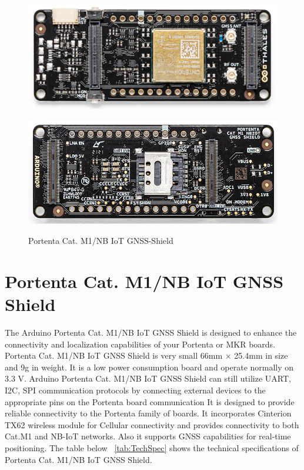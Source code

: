 \begin{figure}
	\begin{center}
		\includegraphics[width=0.7\linewidth]{Images/PotentaIoTGNSSShield/BoardFront.png}
		\label{BoardFront}
	\end{center}
\end{figure}

\begin{figure}
	\begin{center}
		\includegraphics[width=0.7\linewidth]{Images/PotentaIoTGNSSShield/BoardBack.png}
		\caption{Portenta Cat. M1/NB IoT GNSS-Shield}
		\label{BoardBack}
		\cite{ArduinoPortentaStore:2024}
	\end{center}
\end{figure}

\section{Portenta Cat. M1/NB IoT GNSS Shield}

The Arduino Portenta Cat. M1/NB IoT GNSS Shield is designed to enhance the connectivity and localization capabilities of your Portenta or MKR boards. Portenta Cat. M1/NB IoT GNSS Shield is very small 66mm × 25.4mm in size and 9g in weight. It is a low power consumption board and operate normally on 3.3 V. Arduino Portenta Cat. M1/NB IoT GNSS Shield can still utilize UART, I2C, SPI communication protocols by connecting external devices to the appropriate pins on the Portenta board communication It is designed to provide reliable connectivity to the Portenta family of boards. It incorporates Cinterion TX62 wireless module for Cellular connectivity and provides connectivity to both Cat.M1 and NB-IoT networks. Also it supports GNSS capabilities for real-time positioning. The table below ~\ref{tab:TechSpec} shows the technical specifications of Portenta Cat. M1/NB IoT GNSS Shield. \cite{ArduinoPortenta:2024}

